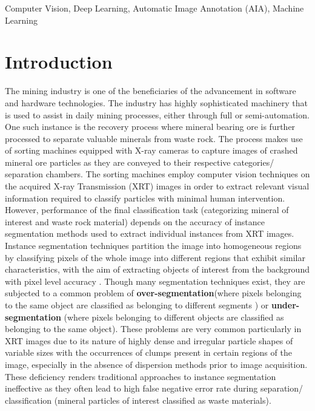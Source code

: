 \documentclass[conference]{IEEEtran}
\begin{document}
\begin{IEEEkeywords}
Computer Vision, Deep Learning, Automatic Image Annotation (AIA), Machine Learning
\end{IEEEkeywords}

\section{Introduction}
	The mining industry is one of the beneficiaries of the advancement in software and hardware
technologies. The industry has highly sophisticated machinery that is used to assist in daily
mining processes, either through full or semi-automation. One such instance is the recovery
process where mineral bearing ore is further processed to separate valuable minerals from
waste rock. The process makes use of sorting machines equipped with X-ray
cameras to capture images of crashed mineral ore particles as they are conveyed to their
respective categories/ separation chambers. The sorting machines employ computer vision techniques on the acquired
 X-ray Transmission (XRT) images in order to extract relevant visual information required
to classify particles with minimal human intervention.\\

However, performance of the final classification task (categorizing mineral of interest and waste rock material) depends on the accuracy of instance segmentation methods used to
extract individual instances from XRT images. Instance segmentation techniques partition the image into homogeneous regions by classifying pixels of the whole image into different regions that exhibit similar characteristics, with the aim of extracting objects of interest from
the background with pixel level accuracy \cite{b1}. Though many segmentation techniques exist,
they are subjected to a common problem of \textbf{over-segmentation}(where pixels belonging to
the same object are classified as belonging to different segments ) or \textbf{under-segmentation}
(where pixels belonging to different objects are classified as belonging to the same object).
These problems are very common particularly in XRT images due to its nature of highly
 dense and irregular particle shapes of variable sizes with the occurrences of clumps present
in certain regions of the image, especially in the absence of dispersion methods prior to
 image acquisition.
 These deficiency renders traditional approaches to instance segmentation ineffective as
they often lead to high false negative error rate during separation/ classification (mineral particles of interest classified as waste materials).\\
\end{document}
